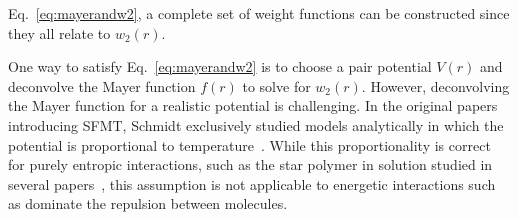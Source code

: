 \documentclass[letterpaper,twocolumn,amsmath,amssymb,prb]{revtex4-1}
\begin{document}
Eq.~\ref{eq:mayerandw2}, a complete set of weight functions
can be constructed since they all relate to $w_2(r)$.

One way to satisfy Eq.~\ref{eq:mayerandw2} is to choose a pair 
potential $V(r)$ and deconvolve the Mayer function $f(r)$ to solve for $w_2(r)$. 
However, deconvolving the Mayer function for a realistic potential is 
challenging. %
In the original papers introducing SFMT, Schmidt
exclusively studied models analytically in which the potential is
proportional to temperature~\cite{schmidt1999density,
  schmidt2000fluid}.  While this proportionality is correct for purely
entropic interactions, such as the star polymer in solution studied in
several papers~\cite{schmidt1999density}, this assumption is not
applicable to energetic interactions such as dominate the repulsion
between molecules.
\end{document}
